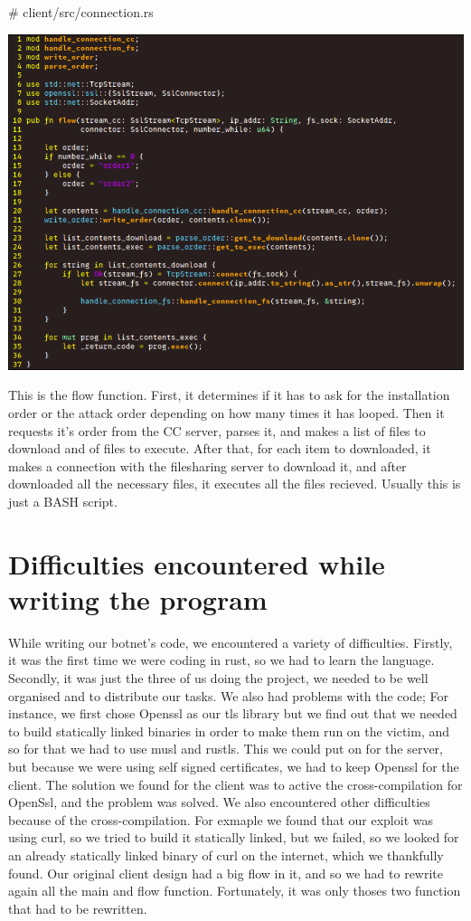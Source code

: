 \documentclass[../main.tex]{subfiles}
\begin{document}
    \# client/src/connection.rs

    \includegraphics[width=450pt]{client_flow.png}

    This is the flow function.
    First, it determines if it has to ask for the installation order or the attack order depending on how many times it has looped.
    Then it requests it's order from the CC server, parses it, and makes a list of files to download and of files to execute.
    After that, for each item to downloaded, it makes a connection with the filesharing server to download it, and after downloaded all the necessary files, it executes all the files recieved.
    Usually this is just a BASH script.


	\vspace{10pt}

	\section{Difficulties encountered while writing the program}

    While writing our botnet's code, we encountered a variety of difficulties.
    Firstly, it was the first time we were coding in rust, so we had to learn the language.
    Secondly, it was just the three of us doing the project, we needed to be well organised and to distribute our tasks.
    We also had problems with the code;
    For instance, we first chose Openssl as our tls library but we find out that we needed to build statically linked binaries in order to make them run on the victim, and so for that we had to use musl and rustls.
    This we could put on for the server, but because we were using self signed certificates, we had to keep Openssl for the client.
    The solution we found for the client was to active the cross-compilation for OpenSsl, and the problem was solved.
    We also encountered other difficulties because of the cross-compilation.
    For exmaple we found that our exploit was using curl, so we tried to build it statically linked, but we failed, so we looked for an already statically linked binary of curl on the internet, which we thankfully found.
    Our original client design had a big flow in it, and so we had to rewrite again all the main and flow function.
    Fortunately, it was only thoses two function that had to be rewritten.
\end{document}
